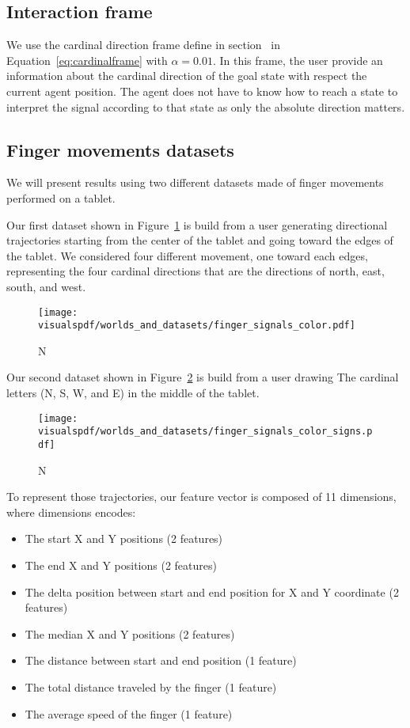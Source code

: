 \subsection{Interaction frame}

We use the cardinal direction frame define in section~\label{chapter:limitations:framegeneric} in Equation~\ref{eq:cardinalframe} with $\alpha = 0.01$. In this frame, the user provide an information about the cardinal direction of the goal state with respect the current agent position. The agent does not have to know how to reach a state to interpret the signal according to that state as only the absolute direction matters.

\subsection{Finger movements datasets}

We will present results using two different datasets made of finger movements performed on a tablet. 

Our first dataset shown in Figure~\ref{fig:fingerdatasetdirection} is build from a user generating directional trajectories starting from the center of the tablet and going toward the edges of the tablet. We considered four different movement, one toward each edges, representing the four cardinal directions that are the directions of north, east, south, and west. 

\begin{figure}[!ht]
\centering
\texttt{[image: \\visualspdf/worlds\_and\_datasets/finger\_signals\_color.pdf]}
\caption{N}
\label{fig:fingerdatasetdirection}
\end{figure} 

Our second dataset shown in Figure~\ref{fig:fingerdatasetsigns} is build from a user drawing The cardinal letters (N, S, W, and E) in the middle of the tablet.

\begin{figure}[!ht]
\centering
\texttt{[image: \\visualspdf/worlds\_and\_datasets/finger\_signals\_color\_signs.pdf]}
\caption{N}
\label{fig:fingerdatasetsigns}
\end{figure} 

To represent those trajectories, our feature vector is composed of 11 dimensions, where dimensions encodes:
\begin{itemize}
   \item The start X and Y positions (2 features)
   \item The end X and Y positions (2 features)
   \item The delta position between start and end position for X and Y coordinate (2 features)
   \item The median X and Y positions (2 features)
   \item The distance between start and end position (1 feature)
   \item The total distance traveled by the finger (1 feature)
   \item The average speed of the finger (1 feature)
\end{itemize}

